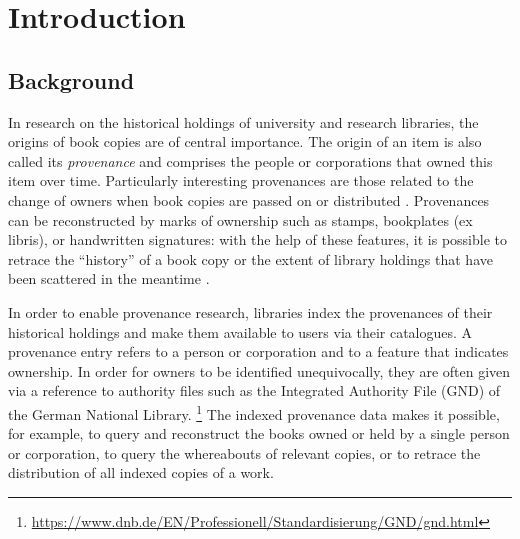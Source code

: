 \chapter{Introduction}
\label{chap:intro}

\section{Background}
\label{sec:background}

In research on the historical holdings of university and research libraries,
the origins of book copies are of central importance.
The origin of an item is also called its \emph{provenance} 
and comprises the people or corporations that owned this item over time.
Particularly interesting provenances are those related to the change of
owners when book copies are passed on or distributed \autocite[p.\,2]{Hakelberg2016}.
Provenances can be reconstructed by marks of ownership
such as stamps, bookplates (ex libris), or handwritten signatures:
with the help of these features, it is possible to retrace
the \enquote{history} of a book copy
or the extent of library holdings that have been scattered in the meantime \autocite[p.\,2]{Hakelberg2016}.

In order to enable provenance research,
libraries index the provenances of their historical holdings
and make them available to users via their catalogues.
A provenance entry refers to a person or corporation
and to a feature that indicates ownership.
In order for owners to be identified unequivocally,
they are often given via a reference to authority files such as the
Integrated Authority File (GND) of the German National Library.%
\footnote{%
  \url{https://www.dnb.de/EN/Professionell/Standardisierung/GND/gnd.html}%
}
The indexed provenance data makes it possible, for example,
to query and reconstruct the books owned or held by a single person or corporation,
to query the whereabouts of relevant copies,
or to retrace the distribution of all indexed copies of a work.

